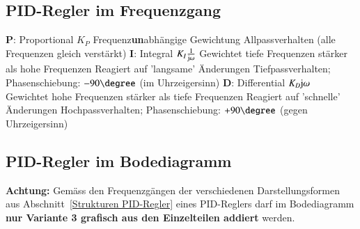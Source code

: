 \subsection{PID-Regler im Frequenzgang}

\begin{outline}
    \1 \textbf{P}: Proportional $K_P$
        \2 Frequenz\textbf{un}abhängige Gewichtung
        \2 Allpassverhalten (alle Frequenzen gleich verstärkt)
    \1 \textbf{I}: Integral $K_I \frac{1}{\mathrm{j} \omega}$
        \2 Gewichtet tiefe Frequenzen stärker als hohe Frequenzen
        \2 Reagiert auf 'langsame' Änderungen 
        \2 Tiefpassverhalten; Phasenschiebung: $-90 \degree$ (im Uhrzeigersinn)
    \1 \textbf{D}: Differential $K_D \mathrm{j} \omega$
        \2 Gewichtet hohe Frequenzen stärker als tiefe Frequenzen
        \2 Reagiert auf 'schnelle' Änderungen 
        \2 Hochpassverhalten; Phasenschiebung: $+90 \degree$ (gegen Uhrzeigersinn)
\end{outline}


\subsection{PID-Regler im Bodediagramm}

\textbf{Achtung:} Gemäss den Frequenzgängen der verschiedenen Darstellungsformen aus Abschnitt~\ref{Strukturen PID-Regler} 
eines PID-Reglers darf im Bodediagramm \textbf{nur Variante 3 grafisch aus den Einzelteilen addiert} werden. 

